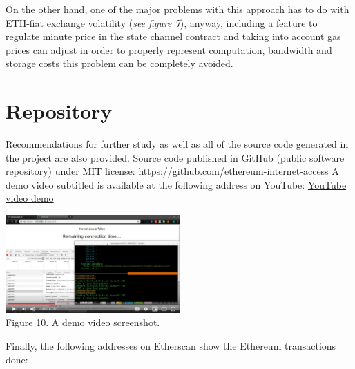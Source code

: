 \documentclass[12pt]{amsart}
\begin{document}
\begin{multicols}{2}
\vspace{0.35cm}

On the other hand, one of the major problems with this approach has to do
with ETH-fiat exchange volatility
(\textit{see figure 7}), anyway, including
a feature to regulate minute price in the state channel
contract and taking into account gas prices can adjust
in order to properly
represent computation, bandwidth and storage costs this
problem can be completely avoided.

\section{Repository}\label{sec:repository}

\vspace{0.35cm}

Recommendations for further study as well as all of the source code generated in the project are also provided.
\newline\newline
Source code published in GitHub (public software repository) under MIT license:
\newline\newline
\href{https://github.com/ethereum-internet-access}{https://github.com/ethereum-internet-access}
\newline\newline
A demo video subtitled is available at the following address on YouTube:
\newline\newline
\href{https://www.youtube.com/watch?v=C9pVMn-pu_8&hd=1}{YouTube video demo}


\begin{center}
  \includegraphics[keepaspectratio, width=0.5\textwidth]{images/maxresdefault.eps}
\\
Figure 10. A demo video screenshot.
\\
\end{center}
\vspace{0.15cm}
Finally, the following addresses on Etherscan show the Ethereum transactions done:
\newline\newline


\end{multicols}
\end{document}
